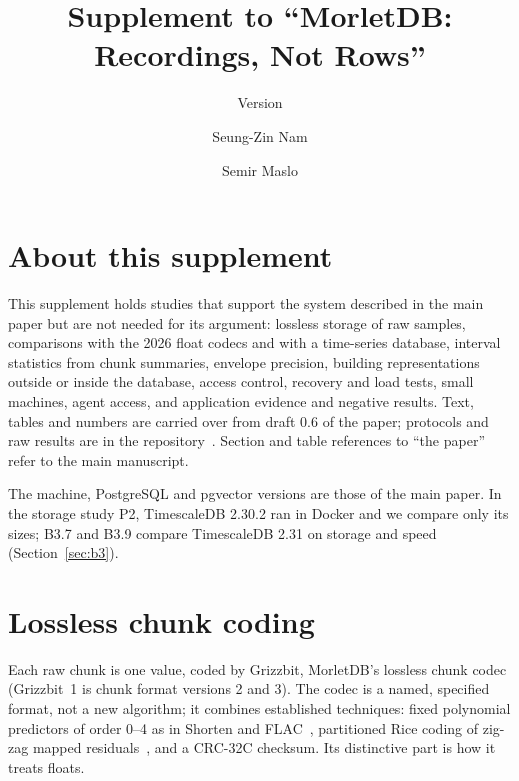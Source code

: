 \documentclass[sigconf,nonacm]{acmart}
\newcommand{\M}{MorletDB}
\begin{document}
\title{Supplement to ``MorletDB: Recordings, Not Rows''}
\subtitle{Version \ReportVersion}
\author{Seung-Zin Nam}
\author{Semir Maslo}
\maketitle
\section*{About this supplement}
This supplement holds studies that support the system described in the main paper but are not needed for its argument: lossless storage of raw samples, comparisons with the 2026 float codecs and with a time-series database, interval statistics from chunk summaries, envelope precision, building representations outside or inside the database, access control, recovery and load tests, small machines, agent access, and application evidence and negative results. Text, tables and numbers are carried over from draft 0.6 of the paper; protocols and raw results are in the repository~\cite{repo}. Section and table references to ``the paper'' refer to the main manuscript.

The machine, PostgreSQL and pgvector versions are those of the main paper. In the storage study P2, TimescaleDB 2.30.2 ran in Docker and we compare only its sizes; B3.7 and B3.9 compare TimescaleDB 2.31 on storage and speed (Section~\ref{sec:b3}).

\section{Lossless chunk coding}\label{sec:codec}
Each raw chunk is one  value, coded by Grizzbit, \M{}'s lossless chunk codec (Grizzbit~1 is chunk format versions 2 and 3). The codec is a named, specified format, not a new algorithm; it combines established techniques: fixed polynomial predictors of order 0--4 as in Shorten and FLAC~\cite{shorten,flac}, partitioned Rice coding of zig-zag mapped residuals~\cite{rice}, and a CRC-32C checksum. Its distinctive part is how it treats floats.
\end{document}
